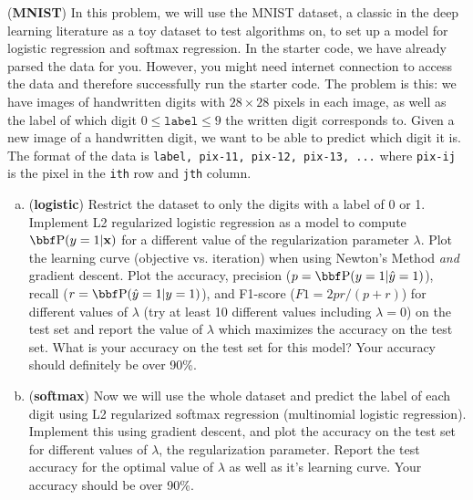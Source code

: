 \documentclass[12pt,letterpaper,fleqn]{hmcpset}
\begin{document}
\begin{problem}[2]
(\textbf{MNIST}) 
In this problem, we will use the MNIST dataset, a classic in the deep learning literature as a toy dataset to test
algorithms on, to set up a model for logistic regression and softmax regression. In the starter code, we have already parsed the data for you. However, you might need internet connection to access the data and therefore successfully run the starter code.
\newline
\newline
The problem is this: we have images of handwritten
digits with $28\times 28$ pixels in each image, as well as the label of which digit $0 \leq \texttt{label} \leq 9$ the written
digit corresponds to. Given a new image of a handwritten digit, we want to be
able to predict which digit it is.
The format of the data is \texttt{label, pix-11, pix-12, pix-13, ...}
where \texttt{pix-ij} is the pixel in the \texttt{ith} row and \texttt{jth} column.
\newline
\begin{enumerate}[(a)]
    \item (\textbf{logistic}) Restrict the dataset to only the digits with a label
        of 0 or 1. Implement L2 regularized logistic regression as a model to compute
        $\PP(y=1|\xx)$ for a different value of the regularization parameter $\lambda$.
        Plot the learning curve (objective vs. iteration) when using Newton's Method
        \textit{and} gradient descent.
        Plot the accuracy, precision ($p = \PP(y=1 | \hat y=1)$), recall ($r = \PP(\hat y=1 | y=1)$),
        and F1-score ($F1 = 2pr / (p+r)$) for different values of $\lambda$ (try at least
        10 different values including $\lambda = 0$) on the test set and report the
        value of $\lambda$ which maximizes the accuracy on the test set. What is your
        accuracy on the test set for this model? Your accuracy should definitely be
        over 90\%.

    \item (\textbf{softmax}) Now we will use the whole dataset and predict the label
        of each digit using L2 regularized softmax regression (multinomial logistic
        regression). Implement this using gradient descent, and plot the accuracy
        on the test set for different values of $\lambda$, the regularization parameter.
        Report the test accuracy for the optimal value of $\lambda$ as well as it's
        learning curve. Your accuracy should be over 90\%.

\end{enumerate}
\end{problem}
\end{document}
